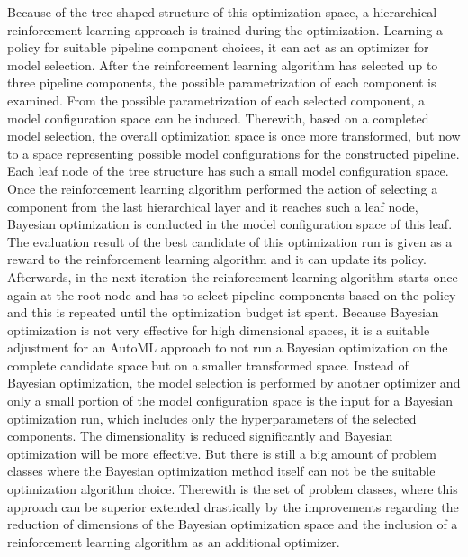Because of the tree-shaped structure of this optimization space, a hierarchical reinforcement learning approach is trained during the optimization.
Learning a policy for suitable pipeline component choices, it can act as an optimizer for model selection.\newline
After the reinforcement learning algorithm has selected up to three pipeline components, the possible parametrization of each component is examined.
From the possible parametrization of each selected component, a model configuration space can be induced.
Therewith, based on a completed model selection, the overall optimization space is once more transformed, but now to a space representing possible model configurations for the constructed pipeline.
Each leaf node of the tree structure has such a small model configuration space.\newline
Once the reinforcement learning algorithm performed the action of selecting a component from the last hierarchical layer and it reaches such a leaf node, Bayesian optimization is conducted in the model configuration space of this leaf.
The evaluation result of the best candidate of this optimization run is given as a reward to the reinforcement learning algorithm and it can update its policy.
Afterwards, in the next iteration the reinforcement learning algorithm starts once again at the root node and has to select pipeline components based on the policy and this is repeated until the optimization budget ist spent.\newline
Because Bayesian optimization is not very effective for high dimensional spaces, it is a suitable adjustment for an AutoML approach to not run a Bayesian optimization on the complete candidate space but on a smaller transformed space.
Instead of Bayesian optimization, the model selection is performed by another optimizer and only a small portion of the model configuration space is the input for a Bayesian optimization run, which includes only the hyperparameters of the selected components.
The dimensionality is reduced significantly and Bayesian optimization will be more effective.\newline
But there is still a big amount of problem classes where the Bayesian optimization method itself can not be the suitable optimization algorithm choice.
Therewith is the set of problem classes, where this approach can be superior extended drastically by the improvements regarding the reduction of dimensions of the Bayesian optimization space and the inclusion of a reinforcement learning algorithm as an additional optimizer.

